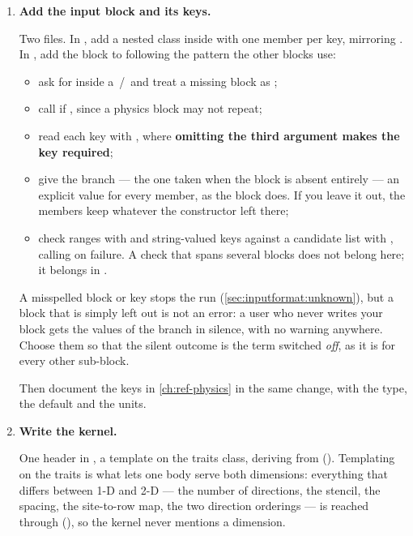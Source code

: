 \begin{enumerate}
\item \textbf{Add the input block and its keys.}

Two files. In , add a nested class inside
 with one member per key, mirroring
. In , add the block
to  following the pattern the other blocks use:

\begin{itemize}
  \item ask for  inside a \,/\, and treat a missing block as ;
  \item call  if , since a physics block may not
    repeat;
  \item read each key with , where
    \textbf{omitting the third argument makes the key required};
  \item give the  branch --- the one taken when the block is absent
    entirely --- an explicit value for every member, as the
     block does. If you leave it out, the members keep
    whatever the constructor left there;
  \item check ranges with  and string-valued keys against a
    candidate list with , calling  on
    failure. A check that spans several blocks does not belong here; it belongs
    in .
\end{itemize}

\begin{warn}
  A misspelled block or key stops the run (\cref{sec:inputformat:unknown}), but
  a block that is simply left out is not an error: a user who never writes
  your block gets the values of the  branch in silence, with no
  warning anywhere. Choose them so that the silent outcome is the term
  switched \emph{off}, as it is for every other  sub-block.
\end{warn}

Then document the keys in \cref{ch:ref-physics} in the same change, with the
type, the default and the units.

\item \textbf{Write the kernel.}

One header in , a template on the traits
class, deriving from 
(). Templating on the traits is what lets one body
serve both dimensions: everything that differs between 1-D and 2-D --- the
number of directions, the stencil, the spacing, the site-to-row map, the two
direction orderings --- is reached through 
(), so the kernel never mentions a dimension.


\end{enumerate}
